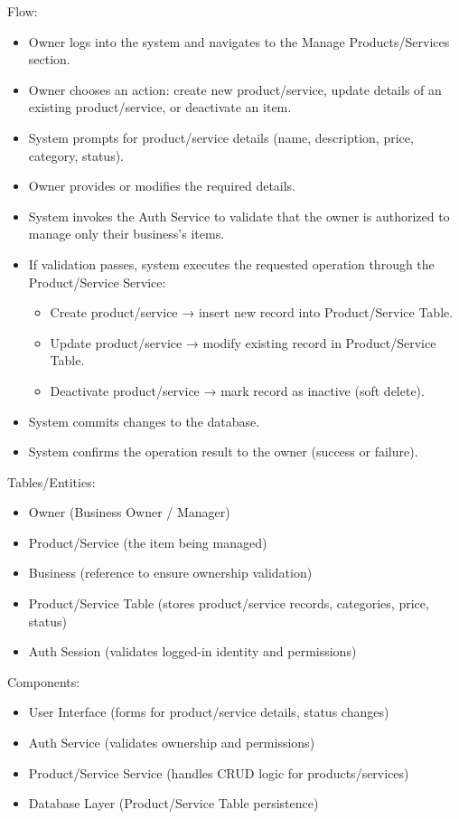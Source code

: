 \documentclass[]{VUMIFTemplateClass}
\begin{document}
Flow:
\begin{itemize}
\setlength{\itemsep}{2pt}
\setlength{\parskip}{0pt}
\setlength{\parsep}{0pt}
\item Owner logs into the system and navigates to the Manage Products/Services section.
\item Owner chooses an action: create new product/service, update details of an existing product/service, or deactivate an item.
\item System prompts for product/service details (name, description, price, category, status).
\item Owner provides or modifies the required details.
\item System invokes the Auth Service to validate that the owner is authorized to manage only their business’s items.
\item If validation passes, system executes the requested operation through the Product/Service Service:
\begin{itemize}
\item Create product/service → insert new record into Product/Service Table.
\item Update product/service → modify existing record in Product/Service Table.
\item Deactivate product/service → mark record as inactive (soft delete).
\end{itemize}
\item System commits changes to the database.
\item System confirms the operation result to the owner (success or failure).
\end{itemize}

Tables/Entities:
\begin{itemize}
\setlength{\itemsep}{2pt}
\setlength{\parskip}{0pt}
\setlength{\parsep}{0pt}
\item Owner (Business Owner / Manager)
\item Product/Service (the item being managed)
\item Business (reference to ensure ownership validation)
\item Product/Service Table (stores product/service records, categories, price, status)
\item Auth Session (validates logged-in identity and permissions)
\end{itemize}

Components:
\begin{itemize}
\setlength{\itemsep}{2pt}
\setlength{\parskip}{0pt}
\setlength{\parsep}{0pt}
\item User Interface (forms for product/service details, status changes)
\item Auth Service (validates ownership and permissions)
\item Product/Service Service (handles CRUD logic for products/services)
\item Database Layer (Product/Service Table persistence)
\end{itemize}
\end{document}
